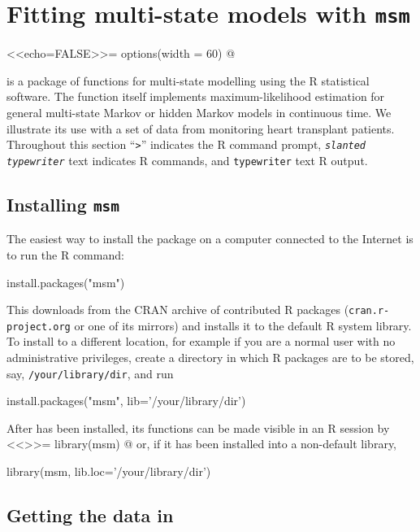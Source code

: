 \section{Fitting multi-state models with {\tt msm}}

<<echo=FALSE>>=
options(width = 60)
@

 is a package of functions for multi-state modelling using
the R statistical software.  The  function itself
implements maximum-likelihood estimation for general multi-state
Markov or hidden Markov models in continuous time. We illustrate
its use with a set of data from monitoring heart transplant patients.
Throughout this section ``\textsl{\texttt{>}}'' indicates the R
command prompt, \textsl{\texttt{slanted typewriter}} text indicates R
commands, and \texttt{typewriter} text R output.

\subsection{Installing \tt{msm}}
\label{sec:installing}

The easiest way to install the  package on a computer
connected to the Internet is to run the R command:

\begin{Scode}
  install.packages("msm")
\end{Scode}

This downloads  from the CRAN archive of contributed R
packages (\texttt{cran.r-project.org} or one of its mirrors) and
installs it to the default R system library.  To install to a
different location, for example if you are a normal user with no
administrative privileges, create a directory in which R packages are
to be stored, say, \texttt{/your/library/dir}, and run

\begin{Scode}
  install.packages("msm", lib='/your/library/dir')
\end{Scode}

After  has been installed, its functions can be made
visible in an R session by
<<>>=
library(msm)
@
or, if it has been installed into a non-default library,

\begin{Scode}
  library(msm, lib.loc='/your/library/dir')
\end{Scode}


\subsection{Getting the data in}
\label{sec:datain}

